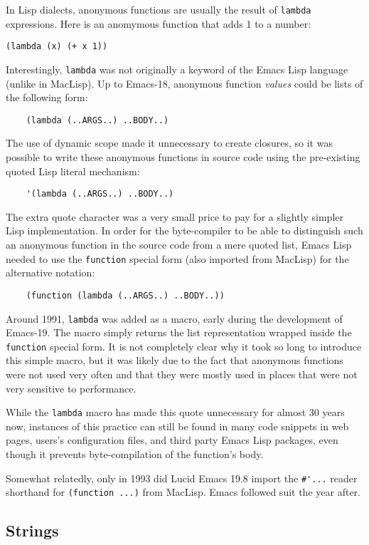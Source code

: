 \documentclass[format=acmsmall, review]{acmart}
\newcommand \Elisp {Emacs Lisp}
\begin{document}
In Lisp dialects, anonymous functions are usually the result of
\texttt{lambda} expressions.  Here is an anomymous function that adds
1 to a number:
%
\begin{verbatim}
(lambda (x) (+ x 1))
\end{verbatim}
%
Interestingly, \texttt{lambda} was not originally a keyword of the
\Elisp{} language (unlike in MacLisp).  Up to Emacs-18, anonymous
function \emph{values} could be lists of the following form:
%
\begin{verbatim}
    (lambda (..ARGS..) ..BODY..)
\end{verbatim}
%
The use of dynamic scope made it unnecessary to create closures, so it was
possible to write these anonymous functions in source code using the
pre-existing quoted Lisp literal mechanism:
%
\begin{verbatim}
    '(lambda (..ARGS..) ..BODY..)
\end{verbatim}
%
The extra quote character was a very small price to pay for a slightly
simpler Lisp implementation.  In order for the byte-compiler to be able
to distinguish such an anonymous function in the source code from a mere
quoted list, \Elisp{} needed to use the \texttt{function} special form (also
imported from MacLisp) for the alternative notation:
%
\begin{verbatim}
    (function (lambda (..ARGS..) ..BODY..))
\end{verbatim}
%
Around 1991, \texttt{lambda} was added as a macro, early during the
development of Emacs-19.  The macro simply returns the list representation
wrapped inside the \texttt{function} special form.  It is not completely
clear why it took so long to introduce this simple macro, but it was likely
due to the fact that anonymous functions were not used very often and that
they were mostly used in places that were not very sensitive to performance.

While the \texttt{lambda} macro has made this quote unnecessary for almost
30 years now, instances of this practice can still be found in many code
snippets in web pages, users's configuration files, and third party \Elisp{}
packages, even though it prevents byte-compilation of the function's body.

Somewhat relatedly, only in 1993 did Lucid Emacs 19.8 import the
\verb|#'...| reader shorthand for \texttt{(function ...)} from MacLisp.
Emacs followed suit the year after.

\subsection{Strings}
\label{sec:strings}
\end{document}
